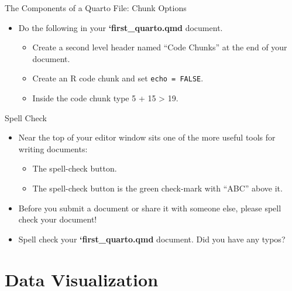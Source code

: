 \documentclass[
  ignorenonframetext,
]{beamer}
\providecommand{\tightlist}{%
  \setlength{\itemsep}{0pt}\setlength{\parskip}{0pt}}
\begin{document}
\begin{frame}[fragile]{The Components of a Quarto File: Chunk Options}
\label{the-components-of-a-quarto-file-chunk-options-1}
\begin{itemize}
\item
  Do the following in your \textbf{`first\_quarto.qmd} document.

  \begin{itemize}
  \tightlist
  \item
    Create a second level header named ``Code Chunks'' at the end of
    your document.
  \item
    Create an R code chunk and set \texttt{echo\ =\ FALSE}.
  \item
    Inside the code chunk type 5 + 15 \textgreater{} 19.
  \end{itemize}
\end{itemize}
\end{frame}

\begin{frame}{Spell Check}
\label{spell-check}
\begin{itemize}
\item
  Near the top of your editor window sits one of the more useful tools
  for writing documents:

  \begin{itemize}
  \tightlist
  \item
    The spell-check button.
  \item
    The spell-check button is the green check-mark with ``ABC'' above
    it.
  \end{itemize}
\item
  Before you submit a document or share it with someone else, please
  spell check your document!
\item
  Spell check your \textbf{`first\_quarto.qmd} document. Did you have
  any typos?
\end{itemize}
\end{frame}

\section{Data Visualization}\label{data-visualization}
\end{document}
